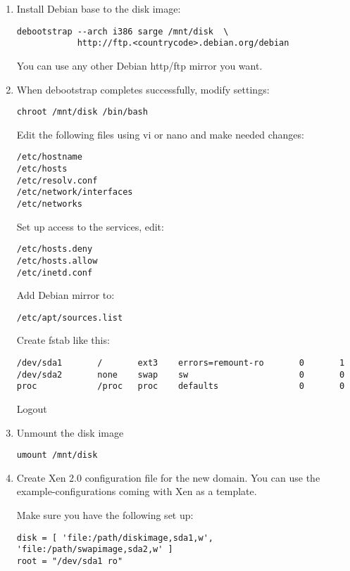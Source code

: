 \begin{enumerate}
\item Install Debian base to the disk image:
\begin{verbatim}
debootstrap --arch i386 sarge /mnt/disk  \
            http://ftp.<countrycode>.debian.org/debian
\end{verbatim}

  You can use any other Debian http/ftp mirror you want.

\item When debootstrap completes successfully, modify settings:
\begin{verbatim}
chroot /mnt/disk /bin/bash
\end{verbatim}

Edit the following files using vi or nano and make needed changes:
\begin{verbatim}
/etc/hostname
/etc/hosts
/etc/resolv.conf
/etc/network/interfaces
/etc/networks
\end{verbatim}

Set up access to the services, edit:
\begin{verbatim}
/etc/hosts.deny
/etc/hosts.allow
/etc/inetd.conf
\end{verbatim}

Add Debian mirror to:   
\begin{verbatim}
/etc/apt/sources.list
\end{verbatim}

Create fstab like this:
\begin{verbatim}
/dev/sda1       /       ext3    errors=remount-ro       0       1
/dev/sda2       none    swap    sw                      0       0
proc            /proc   proc    defaults                0       0
\end{verbatim}

Logout

\item Unmount the disk image
\begin{verbatim}
umount /mnt/disk
\end{verbatim}

\item Create Xen 2.0 configuration file for the new domain. You can
  use the example-configurations coming with Xen as a template.

  Make sure you have the following set up:
\begin{verbatim}
disk = [ 'file:/path/diskimage,sda1,w', 'file:/path/swapimage,sda2,w' ]
root = "/dev/sda1 ro"
\end{verbatim}


\end{enumerate}
